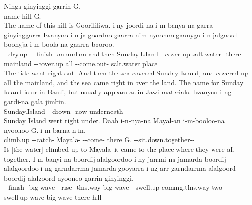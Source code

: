 \begin{exye}
\exy {}
\gll Ninga ginyinggi garrin G.\\
name  hill G.\\
\ft The name of this hill is Goorililiwa.
\exy {}%
\gll i-ny-joordi-na i-m-banya-na garra ginyinggarra Iwanyoo i-n-jalgoordoo gaarra-nim nyoonoo gaanyga i-n-jalgoord boonyja i-m-boola-na gaarra booroo.\\
--dry.up- --finish- on.and.on and.then Sunday.Island --cover.up salt.water- there mainland --cover.up all --come.out- salt.water place\\
\ft The tide went right out. And then the sea covered Sunday Island, and covered up all the mainland, and the sea came right in over the land.
\nt The name for Sunday Island is  or  in Bardi, but usually appears as  in Jawi materials.
\exy {}
\gll Iwanyoo i-ng-gardi-na gala jimbin.\\
Sunday.Island --drown- now underneath\\
\ft Sunday Island went right under.
\exy {}
\gll Daab i-n-nya-na Mayal-an i-m-booloo-na nyoonoo G. i-m-barna-n-in.\\
climb.up --catch- Mayala- --come- there G. --sit.down.together--\\
\ft It [the water] climbed up to Mayala--it came to the place where they were all together.
\exy {}
\gll I-m-banyi-na boordij alalgoordoo i-ny-jarrmi-na jamarda boordij alalgoordoo i-ng-garndarrma jamarda gooyarra i-ng-arr-garndarrma alalgoord boordij alalgoord nyoonoo garrin ginyinggi.\\
--finish- big wave --rise- this.way big wave --swell.up coming.this.way two ---swell.up wave big wave there hill \\

\end{exye}
